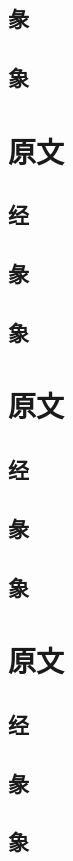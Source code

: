 \documentclass[12pt,oneside]{book}
\begin{document}
\subsection{彖}
\subsection{象}

\section{原文}
\subsection{经}
\subsection{彖}
\subsection{象}


\section{原文}
\subsection{经}
\subsection{彖}
\subsection{象}

\section{原文}
\subsection{经}
\subsection{彖}
\subsection{象}
\end{document}

